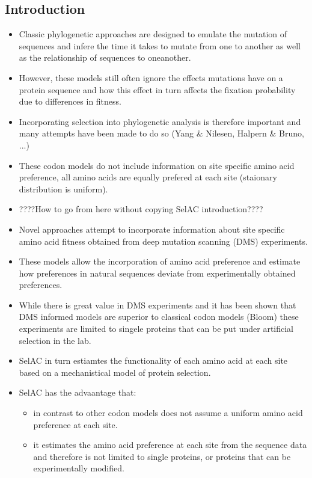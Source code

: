\documentclass[12pt]{article}
\begin{document}
\subsection*{Introduction}
\begin{itemize}
	\item Classic phylogenetic approaches are designed to emulate the mutation of sequences and infere the time it takes to mutate from one to another as well as the relationship of sequences to oneanother.
	\item However, these models still often ignore the effects mutations have on a protein sequence and how this effect in turn affects the fixation probability due to differences in fitness.
	\item Incorporating selection into phylogenetic analysis is therefore important and many attempts have been made to do so (Yang \& Nilesen, Halpern \& Bruno, ...) 
	\item These codon models do not include information on site specific amino acid preference, all amino acids are equally prefered at each site (staionary distribution is uniform).
	\item ????How to go from here without copying SelAC introduction????
	\item Novel approaches attempt to incorporate information about site specific amino acid fitness obtained from deep mutation scanning (DMS) experiments.
	\item These models allow the incorporation of amino acid preference and estimate how preferences in natural sequences deviate from experimentally obtained preferences. 
	\item While there is great value in DMS experiments and it has been shown that DMS informed models are superior to classical codon models (Bloom) these experiments are limited to singele proteins that can be put under artificial selection in the lab.
	\item SelAC in turn estiamtes the functionality of each amino acid at each site based on a mechanistical model of protein selection.
	\item SelAC has the advaantage that:
	\begin{itemize}
		\item in contrast to other codon models does not assume a uniform amino acid preference at each site.
		\item it  estimates the amino acid preference at each site from the sequence data and therefore is not limited to single proteins, or proteins that can be experimentally modified.

\end{itemize}
\end{itemize}
\end{document}
